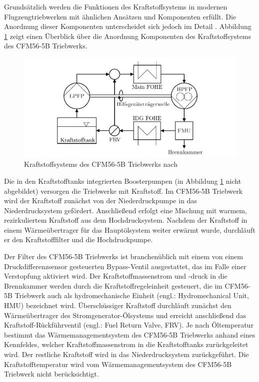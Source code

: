 Grundsätzlich werden die Funktionen des Kraftstoffsystems in modernen Flugzeugtriebwerken mit ähnlichen Ansätzen und Komponenten erfüllt. Die Anordnung dieser Komponenten unterscheidet sich jedoch im Detail \cite{LinkeDiesinger.2014}. Abbildung \ref{fig:2.1} zeigt einen Überblick über die Anordnung Komponenten des Kraftstoffsystems des CFM56-5B Triebwerks. 

\begin{figure}[ht]
\centering
\includegraphics[width=1\linewidth]{4_Abbildungen/2_Hauptteil/Kraftstoffsystem Abbildungen/CFM56 Kraftstoffsystem 2.pdf}
  \caption{Kraftstoffsystems des CFM56-5B Triebwerks nach \cite{LinkeDiesinger.2014}}
  \label{fig:2.1}
\end{figure}
\FloatBarrier

Die in den Kraftstofftanks integrierten Boosterpumpen (in Abbildung \ref{fig:2.1} nicht abgebildet) versorgen die Triebwerke mit Kraftstoff. Im CFM56-5B Triebwerk wird der Kraftstoff zunächst von der Niederdruckpumpe in das Niederdrucksystem gefördert. Anschließend erfolgt eine Mischung mit warmem, rezirkuliertem Kraftstoff aus dem Hochdrucksystem. Nachdem der Kraftstoff in einem Wärmeübertrager für das Hauptölsystem weiter erwärmt wurde, durchläuft er den Kraftstofffilter und die Hochdruckpumpe.

Der Filter des CFM56-5B Triebwerks ist branchenüblich mit einem von einem Druckdifferenzsensor gesteuerten Bypass-Ventil ausgestattet, das im Falle einer Verstopfung aktiviert wird. Der Kraftstoffmassenstrom und -druck in die Brennkammer werden durch die Kraftstoffregeleinheit gesteuert, die im CFM56-5B Triebwerk auch als hydromechanische Einheit (engl.: Hydromechanical Unit, HMU) bezeichnet wird. Überschüssiger Kraftstoff durchläuft zunächst den Wärmeübertrager des Stromgenerator-Ölsystems und erreicht anschließend das Kraftstoff-Rückführventil (engl.: Fuel Return Valve, FRV). Je nach Öltemperatur bestimmt das Wärmemanagementsystem des CFM56-5B Triebwerks anhand eines Kennfeldes, welcher Kraftstoffmassenstrom in die Kraftstofftanks zurückgeleitet wird. Der restliche Kraftstoff wird in das Niederdrucksystem zurückgeführt. Die Kraftstofftemperatur wird vom Wärmemanagementsystem des CFM56-5B Triebwerk nicht berücksichtigt. \cite{Braunling.2015, LinkeDiesinger.2014}

